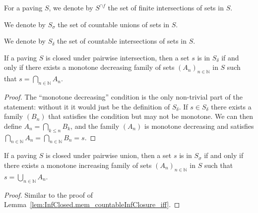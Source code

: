 \begin{definition}\label{def:infClosure}
  \mathlibok
For a paving $S$, we denote by $S^{\cap f}$ the set of finite intersections of sets in $S$.
\end{definition}


\begin{definition}\label{def:countableSupClosure}
  \leanok
We denote by $S_\sigma$ the set of countable unions of sets in $S$.
\end{definition}


\begin{definition}\label{def:countableInfClosure}
  \leanok
We denote by $S_\delta$ the set of countable intersections of sets in $S$.
\end{definition}


\begin{lemma}\label{lem:InfClosed.mem_countableInfClosure_iff}
  \leanok
If a paving $S$ is closed under pairwise intersection, then a set $s$ is in $S_\delta$ if and only if there exists a monotone decreasing family of sets $(A_n)_{n\in\mathbb{N}}$ in $S$ such that $s = \bigcap_{n\in\mathbb{N}} A_n$.
\end{lemma}

\begin{proof}\leanok
The ``monotone decreasing'' condition is the only non-trivial part of the statement: without it it would just be the definition of $S_\delta$.
If $s \in S_\delta$ there exists a family $(B_n)$ that satisfies the condition but may not be monotone. We can then define $A_n = \bigcap_{k \le n} B_k$, and the family $(A_n)$ is monotone decreasing and satisfies $\bigcap_{n\in\mathbb{N}} A_n = \bigcap_{n\in\mathbb{N}} B_n = s$.
\end{proof}


\begin{lemma}\label{lem:SupClosed.mem_countableSupClosure_iff}
  \leanok
If a paving $S$ is closed under pairwise union, then a set $s$ is in $S_\sigma$ if and only if there exists a monotone increasing family of sets $(A_n)_{n\in\mathbb{N}}$ in $S$ such that $s = \bigcup_{n\in\mathbb{N}} A_n$.
\end{lemma}

\begin{proof}\leanok
Similar to the proof of Lemma~\ref{lem:InfClosed.mem_countableInfClosure_iff}.
\end{proof}


